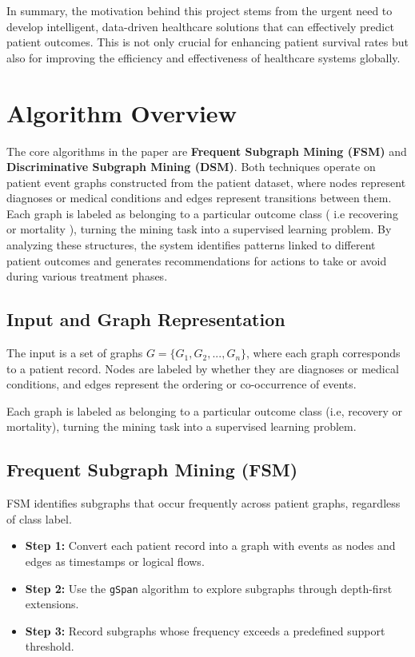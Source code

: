 \documentclass[11pt]{article}
\begin{document}
In summary, the motivation behind this project stems from the urgent need to develop intelligent, data-driven healthcare solutions that can effectively predict patient outcomes. This is not only crucial for enhancing patient survival rates but also for improving the efficiency and effectiveness of healthcare systems globally.

\section{Algorithm Overview}

The core algorithms in the paper are \textbf{Frequent Subgraph Mining (FSM)} and \textbf{Discriminative Subgraph Mining (DSM)}. Both techniques operate on patient event graphs constructed from the patient dataset, where nodes represent diagnoses or medical conditions and edges
represent transitions between them. Each graph is labeled as belonging to a particular outcome class ( i.e recovering or mortality ), turning the mining task into a supervised learning problem. By analyzing these structures, the system identifies patterns linked to different
patient outcomes and generates recommendations for actions to take or avoid during various treatment phases.

\subsection*{Input and Graph Representation}
The input is a set of graphs $G = \{G_1, G_2, ..., G_n\}$, where each graph corresponds to a patient record. Nodes are labeled by whether they are diagnoses or medical conditions, and edges represent the ordering or co-occurrence of events.

Each graph is labeled as belonging to a particular outcome class (i.e, recovery or mortality), turning the mining task into a supervised learning problem.

\subsection*{Frequent Subgraph Mining (FSM)}
FSM identifies subgraphs that occur frequently across patient graphs, regardless of class label.

\begin{itemize}
    \item \textbf{Step 1:} Convert each patient record into a graph with events as nodes and edges as timestamps or logical flows.
    \item \textbf{Step 2:} Use the \texttt{gSpan} algorithm to explore subgraphs through depth-first extensions.
    \item \textbf{Step 3:} Record subgraphs whose frequency exceeds a predefined support threshold.
\end{itemize}
\end{document}
